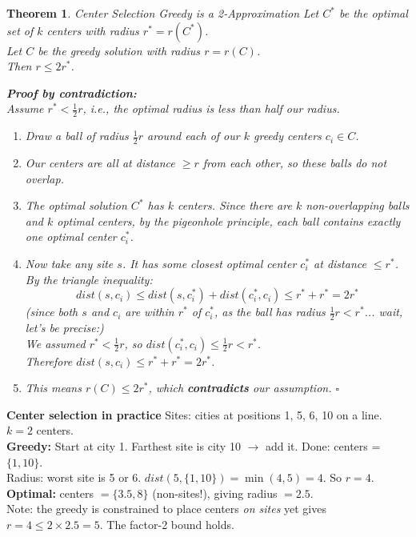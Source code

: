 \documentclass[12pt,a4paper]{report}
\newtheorem{theorem}{Theorem}
\begin{document}
\begin{theorem}{Center Selection Greedy is a 2-Approximation}{}
Let $C^*$ be the optimal set of $k$ centers with radius $r^* = r(C^*)$.\\
Let $C$ be the greedy solution with radius $r = r(C)$.\\
Then $r \leq 2r^*$.

\textbf{Proof by contradiction:}\\
Assume $r^* < \frac{1}{2}r$, i.e., the optimal radius is less than half our radius.

\begin{enumerate}
    \item Draw a ball of radius $\frac{1}{2}r$ around each of our $k$ greedy centers $c_i \in C$.
    \item Our centers are all at distance $\geq r$ from each other, so these balls do not overlap.
    \item The optimal solution $C^*$ has $k$ centers. Since there are $k$ non-overlapping balls and $k$ optimal centers, by the pigeonhole principle, each ball contains exactly one optimal center $c_i^*$.
    \item Now take any site $s$. It has some closest optimal center $c_i^*$ at distance $\leq r^*$.\\
    By the triangle inequality:
    \[
    dist(s, c_i) \leq dist(s, c_i^*) + dist(c_i^*, c_i) \leq r^* + r^* = 2r^*
    \]
    (since both $s$ and $c_i$ are within $r^*$ of $c_i^*$, as the ball has radius $\frac{1}{2}r < r^*$... wait, let's be precise:)\\
    We assumed $r^* < \frac{1}{2}r$, so $dist(c_i^*, c_i) \leq \frac{1}{2}r < r^*$.\\
    Therefore $dist(s, c_i) \leq r^* + r^* = 2r^*$.
    \item This means $r(C) \leq 2r^*$, which \textbf{contradicts} our assumption. $\square$
\end{enumerate}
\end{theorem}

\textbf{Center selection in practice}{}
Sites: cities at positions 1, 5, 6, 10 on a line. $k=2$ centers.\\
\textbf{Greedy:} Start at city 1. Farthest site is city 10 $\to$ add it. Done: centers = $\{1, 10\}$.\\
Radius: worst site is 5 or 6. $dist(5, \{1,10\}) = \min(4, 5) = 4$. So $r = 4$.\\
\textbf{Optimal:} centers $= \{3.5, 8\}$ (non-sites!), giving radius $= 2.5$.\\
Note: the greedy is constrained to place centers \textit{on sites} yet gives $r = 4 \leq 2 \times 2.5 = 5$. The factor-2 bound holds.
\end{document}
